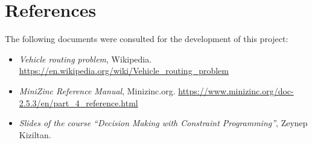 \documentclass[main.tex]{subfiles}
\begin{document}
\section{References}
\label{sec:references}

The following documents were consulted for the development of this project:
\begin{itemize}
    \item \textit{Vehicle routing problem}, Wikipedia. \href{https://en.wikipedia.org/wiki/Vehicle_routing_problem}{https://en.wikipedia.org/wiki/Vehicle\_routing\_problem}
    \item \textit{MiniZinc Reference Manual}, Minizinc.org. \href{https://www.minizinc.org/doc-2.5.3/en/part_4_reference.html}{https://www.minizinc.org/doc-2.5.3/en/part\_4\_reference.html}
    \item \textit{Slides of the course ``Decision Making with Constraint Programming''}, Zeynep Kiziltan.
\end{itemize}
\end{document}
